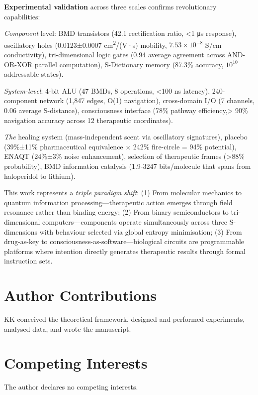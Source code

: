 \documentclass{article}
\theoremstyle{definition}
\theoremstyle{remark}
\begin{document}
\textbf{Experimental validation} across three scales confirms revolutionary capabilities:

\textit{Component} level: BMD transistors (42.1 rectification ratio, <1 μs response), oscillatory holes (0.0123±0.0007 cm\textsuperscript{2}/(V·s) mobility, $7.53\times10^{-8}$ S/cm conductivity), tri-dimensional logic gates (0.94 average agreement across AND-OR-XOR parallel computation), S-Dictionary memory (87.3\% accuracy, $10^{10}$ addressable states).

\textit{System-level}: 4-bit ALU (47 BMDs, 8 operations, <100 ns latency), 240-component network (1,847 edges, O(1) navigation), cross-domain I/O (7 channels, 0.06 average S-distance), consciousness interface (78\% pathway efficiency,> 90\% navigation accuracy across 12 therapeutic coordinates).

\textit{The} healing system (mass-independent scent via oscillatory signatures), placebo (39\%±11\% pharmaceutical equivalence × 242\% fire-circle = 94\% potential), ENAQT (24\%±3\% noise enhancement), selection of therapeutic frames (>88\% probability), BMD information catalysis (1.9-3247 bits/molecule that spans from haloperidol to lithium).

This work represents a \textit{triple paradigm shift}: (1) From molecular mechanics to quantum information processing—therapeutic action emerges through field resonance rather than binding energy; (2) From binary semiconductors to tri-dimensional computers—components operate simultaneously across three S-dimensions with behaviour selected via global entropy minimisation; (3) From drug-as-key to consciousness-as-software—biological circuits are programmable platforms where intention directly generates therapeutic results through formal instruction sets.



\section*{Author Contributions}

KK conceived the theoretical framework, designed and performed experiments, analysed data, and wrote the manuscript.

\section*{Competing Interests}

The author declares no competing interests.
\end{document}
